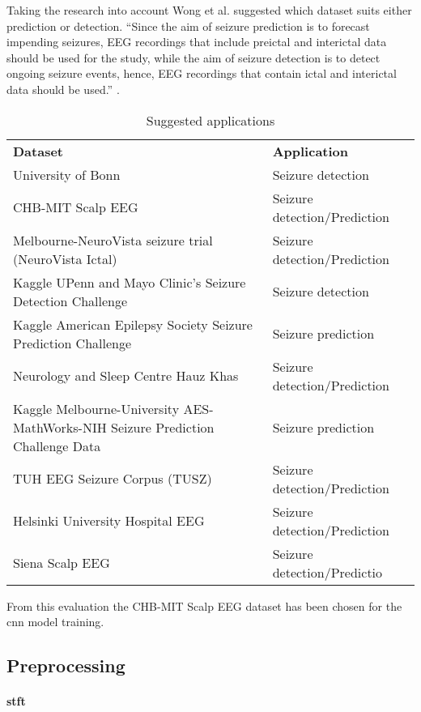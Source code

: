 \documentclass[12pt]{article}
\begin{document}
Taking the research into account Wong et al. suggested which dataset suits either prediction or detection. ``Since the aim of seizure prediction is to forecast impending seizures, EEG recordings that include preictal and interictal data should be used for the study, while the aim of seizure detection is to detect ongoing seizure events, hence, EEG recordings that contain ictal and interictal data should be used.'' \cite{wong2023eeg}.

\begin{table}[H]
\centering
\begin{tabular}{p{}p{}}
\textbf{Dataset}                     & \textbf{Application}         \\
University of Bonn                   & Seizure detection            \\
CHB-MIT Scalp EEG                    & Seizure detection/Prediction \\
Melbourne-NeuroVista seizure trial (NeuroVista Ictal)                           & Seizure detection/Prediction \\
Kaggle UPenn and Mayo Clinic's Seizure Detection Challenge                      & Seizure detection            \\
Kaggle American Epilepsy Society Seizure Prediction Challenge                   & Seizure prediction           \\
Neurology and Sleep Centre Hauz Khas & Seizure detection/Prediction \\
Kaggle Melbourne-University AES-MathWorks-NIH Seizure Prediction Challenge Data & Seizure prediction           \\
TUH EEG Seizure Corpus (TUSZ)        & Seizure detection/Prediction \\
Helsinki University Hospital EEG     & Seizure detection/Prediction \\
Siena Scalp EEG                      & Seizure detection/Predictio 
\end{tabular}
\caption{Suggested applications}
\end{table} 

From this evaluation the CHB-MIT Scalp EEG dataset has been chosen for the \acrshort{cnn} model training. 

\subsection{Preprocessing}

\paragraph{\acrfull{stft}} \mbox{}\\
\end{document}
